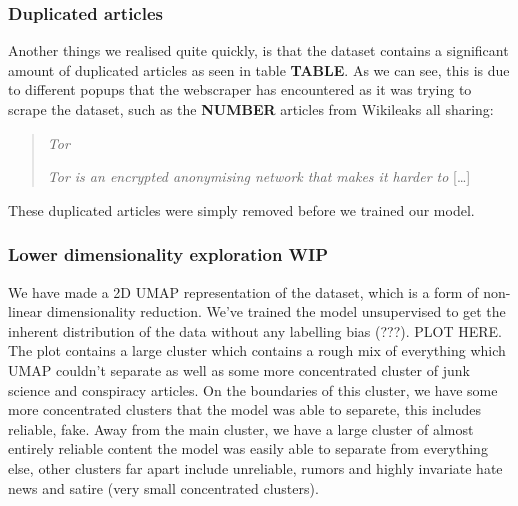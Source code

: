 \subsubsection{Duplicated articles}
Another things we realised quite quickly, is that the dataset contains a significant amount of duplicated articles as
seen in table \textbf{TABLE}. As we can see, this is due to different popups that the webscraper has encountered as it
was trying to scrape the dataset, such as the \textbf{NUMBER} articles from Wikileaks all sharing:
\begin{quote}
    \textit{Tor}

    \textit{Tor is an encrypted anonymising network that makes it harder to} [\dots]\\

\end{quote}
These duplicated articles were simply removed before we trained our model.

\subsubsection{Lower dimensionality exploration WIP}
We have made a 2D UMAP representation of the dataset, which is a form of non-linear dimensionality reduction. We've trained the model unsupervised to get the inherent distribution of the data without any labelling bias (???). PLOT HERE. The plot contains a large cluster which contains a rough mix of everything which UMAP couldn't separate as well as some more concentrated cluster of junk science and conspiracy articles. On the boundaries of this cluster, we have some more concentrated clusters that the model was able to separete, this includes reliable, fake. Away from the main cluster, we have a large cluster of almost entirely reliable content the model was easily able to separate from everything else, other clusters far apart include unreliable, rumors and highly invariate hate news and satire (very small concentrated clusters).



